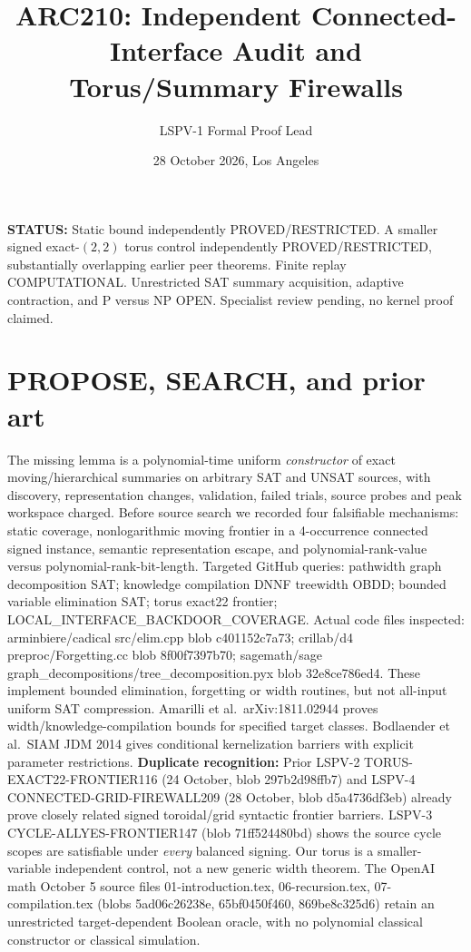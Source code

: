 \documentclass[11pt]{article}
\title{ARC210: Independent Connected-Interface Audit and Torus/Summary Firewalls}
\author{LSPV-1 Formal Proof Lead}
\date{28 October 2026, Los Angeles}
\begin{document}
\maketitle
\noindent\textbf{STATUS:} Static bound independently PROVED/RESTRICTED. A smaller signed exact-$(2,2)$ torus control independently PROVED/RESTRICTED, substantially overlapping earlier peer theorems. Finite replay COMPUTATIONAL. Unrestricted SAT summary acquisition, adaptive contraction, and P versus NP OPEN. Specialist review pending, no kernel proof claimed.
\section{PROPOSE, SEARCH, and prior art}
The missing lemma is a polynomial-time uniform \emph{constructor} of exact moving/hierarchical summaries on arbitrary SAT and UNSAT sources, with discovery, representation changes, validation, failed trials, source probes and peak workspace charged. Before source search we recorded four falsifiable mechanisms: static coverage, nonlogarithmic moving frontier in a 4-occurrence connected signed instance, semantic representation escape, and polynomial-rank-value versus polynomial-rank-bit-length.
Targeted GitHub queries: pathwidth graph decomposition SAT; knowledge compilation DNNF treewidth OBDD; bounded variable elimination SAT; torus exact22 frontier; LOCAL\_INTERFACE\_BACKDOOR\_COVERAGE. Actual code files inspected: arminbiere/cadical src/elim.cpp blob c401152c7a73; crillab/d4 preproc/Forgetting.cc blob 8f00f7397b70; sagemath/sage graph\_decompositions/tree\_decomposition.pyx blob 32e8ce786ed4. These implement bounded elimination, forgetting or width routines, but not all-input uniform SAT compression. Amarilli et al.\ arXiv:1811.02944 proves width/knowledge-compilation bounds for specified target classes. Bodlaender et al.\ SIAM JDM 2014 gives conditional kernelization barriers with explicit parameter restrictions.
\noindent\textbf{Duplicate recognition:} Prior LSPV-2 TORUS-EXACT22-FRONTIER116 (24 October, blob 297b2d98ffb7) and LSPV-4 CONNECTED-GRID-FIREWALL209 (28 October, blob d5a4736df3eb) already prove closely related signed toroidal/grid syntactic frontier barriers. LSPV-3 CYCLE-ALLYES-FRONTIER147 (blob 71ff524480bd) shows the source cycle scopes are satisfiable under \emph{every} balanced signing. Our torus is a smaller-variable independent control, not a new generic width theorem. The OpenAI math October 5 source files 01-introduction.tex, 06-recursion.tex, 07-compilation.tex (blobs 5ad06c26238e, 65bf0450f460, 869be8c325d6) retain an unrestricted target-dependent Boolean oracle, with no polynomial classical constructor or classical simulation.
\end{document}

